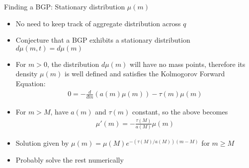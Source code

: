 \documentclass[english,usenames,dvipsnames]{beamer}
\begin{document}
\begin{frame}{Finding a BGP: Stationary distribution $\mu(m)$}
\begin{itemize}
	\small
	\item No need to keep track of aggregate distribution across $q$
	\item Conjecture that a BGP exhibits a stationary distribution $d\mu(m,t) = d\mu(m)$
	\item For $m > 0$, the distribution $d\mu(m)$ will have no mass points, therefore its density $\mu(m)$ is well defined and satisfies the Kolmogorov Forward Equation: 
	\begin{align*}
		0 = -\frac{d}{dm} (a(m) \mu(m)) - \tau(m)\mu(m)  
	\end{align*}
	\item For $m > M$, have $a(m)$ and $\tau(m)$ constant, so the above becomes 
	\begin{align*}
		\mu'(m) = -\frac{\tau(M)}{a(M)} \mu(m)
	\end{align*}
	\item Solution given by $\mu(m) = \mu(M)e^{-(\tau(M) / a(M))(m-M)}$ for $m \ge M$
	\item Probably solve the rest numerically
\end{itemize}
\end{frame}

\begin{comment}
\begin{frame}{Finding a BGP: Stationary distribution $\mu(m)$ (cont.)}
\begin{itemize}
	\item Setting $m=M$ yields $\mu(M) = K$
	\item Integrate numerically to compute $\mu(m)$ for $m < M$
	\item Compute total mass of $m > 0$ by integrating numerically
	\begin{align*}
		M_+ = \int_0^{\infty} \mu(m) dm
	\end{align*}
	\item Finally, compute total rate at which mass 
\end{itemize}
\end{frame}
\end{comment}
\end{document}
